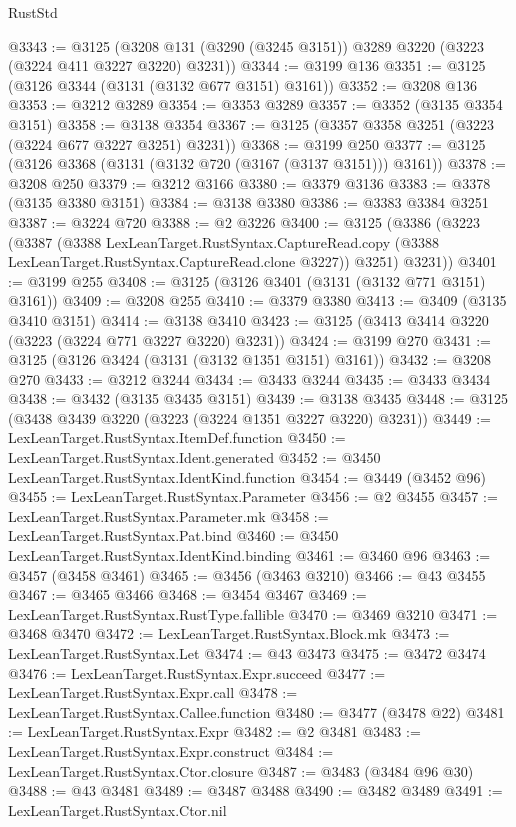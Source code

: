 \begin{lexlean}{RustStd}
\begin{coremodule}
{\begin{coremodule}
{{{{{{{{{{{{{{{{{{{{{{{{{{{{{{{{{{{{{{{{{{{{{@3343 := @3125 (@3208 @131 (@3290 (@3245 @3151)) @3289 @3220 (@3223 (@3224 @411 @3227 @3220) @3231))
@3344 := @3199 @136
@3351 := @3125 (@3126 @3344 (@3131 (@3132 @677 @3151) @3161))
@3352 := @3208 @136
@3353 := @3212 @3289
@3354 := @3353 @3289
@3357 := @3352 (@3135 @3354 @3151)
@3358 := @3138 @3354
@3367 := @3125 (@3357 @3358 @3251 (@3223 (@3224 @677 @3227 @3251) @3231))
@3368 := @3199 @250
@3377 := @3125 (@3126 @3368 (@3131 (@3132 @720 (@3167 (@3137 @3151))) @3161))
@3378 := @3208 @250
@3379 := @3212 @3166
@3380 := @3379 @3136
@3383 := @3378 (@3135 @3380 @3151)
@3384 := @3138 @3380
@3386 := @3383 @3384 @3251
@3387 := @3224 @720
@3388 := @2 @3226
@3400 := @3125
    (@3386
      (@3223
        (@3387
          (@3388
            LexLeanTarget.RustSyntax.CaptureRead.copy
            (@3388 LexLeanTarget.RustSyntax.CaptureRead.clone @3227))
          @3251)
        @3231))
@3401 := @3199 @255
@3408 := @3125 (@3126 @3401 (@3131 (@3132 @771 @3151) @3161))
@3409 := @3208 @255
@3410 := @3379 @3380
@3413 := @3409 (@3135 @3410 @3151)
@3414 := @3138 @3410
@3423 := @3125 (@3413 @3414 @3220 (@3223 (@3224 @771 @3227 @3220) @3231))
@3424 := @3199 @270
@3431 := @3125 (@3126 @3424 (@3131 (@3132 @1351 @3151) @3161))
@3432 := @3208 @270
@3433 := @3212 @3244
@3434 := @3433 @3244
@3435 := @3433 @3434
@3438 := @3432 (@3135 @3435 @3151)
@3439 := @3138 @3435
@3448 := @3125 (@3438 @3439 @3220 (@3223 (@3224 @1351 @3227 @3220) @3231))
@3449 := LexLeanTarget.RustSyntax.ItemDef.function
@3450 := LexLeanTarget.RustSyntax.Ident.generated
@3452 := @3450 LexLeanTarget.RustSyntax.IdentKind.function
@3454 := @3449 (@3452 @96)
@3455 := LexLeanTarget.RustSyntax.Parameter
@3456 := @2 @3455
@3457 := LexLeanTarget.RustSyntax.Parameter.mk
@3458 := LexLeanTarget.RustSyntax.Pat.bind
@3460 := @3450 LexLeanTarget.RustSyntax.IdentKind.binding
@3461 := @3460 @96
@3463 := @3457 (@3458 @3461)
@3465 := @3456 (@3463 @3210)
@3466 := @43 @3455
@3467 := @3465 @3466
@3468 := @3454 @3467
@3469 := LexLeanTarget.RustSyntax.RustType.fallible
@3470 := @3469 @3210
@3471 := @3468 @3470
@3472 := LexLeanTarget.RustSyntax.Block.mk
@3473 := LexLeanTarget.RustSyntax.Let
@3474 := @43 @3473
@3475 := @3472 @3474
@3476 := LexLeanTarget.RustSyntax.Expr.succeed
@3477 := LexLeanTarget.RustSyntax.Expr.call
@3478 := LexLeanTarget.RustSyntax.Callee.function
@3480 := @3477 (@3478 @22)
@3481 := LexLeanTarget.RustSyntax.Expr
@3482 := @2 @3481
@3483 := LexLeanTarget.RustSyntax.Expr.construct
@3484 := LexLeanTarget.RustSyntax.Ctor.closure
@3487 := @3483 (@3484 @96 @30)
@3488 := @43 @3481
@3489 := @3487 @3488
@3490 := @3482 @3489
@3491 := LexLeanTarget.RustSyntax.Ctor.nil
}}}}}}}}}}}}}}}}}}}}}}}}}}}}}}}}}}}}}}}}}}}}}
\end{coremodule}}
\end{coremodule}
\end{lexlean}
